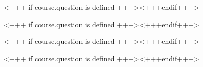 \documentclass[english,xcolor=pdftex,dvipsnames,aspectratio=<+++ if course.aspectratio is defined +++><++course.aspectratio++><+++else+++>43<+++endif+++>]{beamer}
\begin{document}

<+++ if course.question is defined +++><+++endif+++>


<+++ if course.question is defined +++><+++endif+++> 


<+++ if course.question is defined +++><+++endif+++>


<+++ if course.question is defined +++><+++endif+++>

%  
\end{document}
